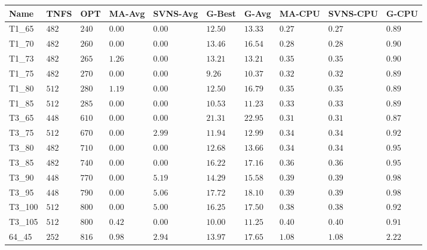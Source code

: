 \begin{center}
    \begin{table}[]
    \centering
    \begin{adjustwidth}{-0.4in}{-1in}
    \begin{tabular}{|lll|l|l|ll|lll|}
\hline
Name    & TNFS    & OPT    & MA-Avg & SVNS-Avg & G-Best   & G-Avg   & MA-CPU & SVNS-CPU & G-CPU \\
\hline
T1\_65  & $482   $& $240 $ & $\bm{0.00}$ & $\bm{0.00}$   & $12.50$  & $13.33$ & $0.27$ & $0.27$ & $0.89$ \\
T1\_70  & $482   $& $260 $ & $\bm{0.00}$ & $\bm{0.00}$   & $13.46$  & $16.54$ & $0.28$ & $0.28$ & $0.90$ \\
T1\_73  & $482   $& $265 $ & $1.26$ & $\bm{0.00}$   & $13.21$  & $13.21$ & $0.35$ & $0.35$ & $0.90$ \\
T1\_75  & $482   $& $270 $ & $\bm{0.00}$ & $\bm{0.00}$   & $9.26 $  & $10.37$ & $0.32$ & $0.32$ & $0.89$ \\
T1\_80  & $512   $& $280 $ & $1.19$ & $\bm{0.00}$   & $12.50$  & $16.79$ & $0.35$ & $0.35$ & $0.89$ \\
T1\_85  & $512   $& $285 $ & $\bm{0.00}$ & $\bm{0.00}$   & $10.53$  & $11.23$ & $0.33$ & $0.33$ & $0.89$ \\
\hline
T3\_65  & $448   $& $610 $ & $\bm{0.00}$ & $\bm{0.00}$   & $21.31$  & $22.95$ & $0.31$ & $0.31$ & $0.87$ \\
T3\_75  & $512   $& $670 $ & $\bm{0.00}$ & $2.99$   & $11.94$  & $12.99$ & $0.34$ & $0.34$ & $0.92$ \\
T3\_80  & $482   $& $710 $ & $\bm{0.00}$ & $\bm{0.00}$   & $12.68$  & $13.66$ & $0.34$ & $0.34$ & $0.95$ \\
T3\_85  & $482   $& $740 $ & $\bm{0.00}$ & $\bm{0.00}$   & $16.22$  & $17.16$ & $0.36$ & $0.36$ & $0.95$ \\
T3\_90  & $448   $& $770 $ & $\bm{0.00}$ & $5.19$   & $14.29$  & $15.58$ & $0.39$ & $0.39$ & $0.98$ \\
T3\_95  & $448   $& $790 $ & $\bm{0.00}$ & $5.06$   & $17.72$  & $18.10$ & $0.39$ & $0.39$ & $0.98$ \\
T3\_100 & $512   $& $800 $ & $\bm{0.00}$ & $5.00$   & $16.25$  & $17.50$ & $0.38$ & $0.38$ & $0.92$ \\
T3\_105 & $512   $& $800 $ & $0.42$ & $\bm{0.00}$   & $10.00$  & $11.25$ & $0.40$ & $0.40$ & $0.91$ \\
\hline
64\_45  & $252   $& $816 $ & $0.98$ & $2.94$   & $13.97$  & $17.65$ & $1.08$ & $1.08$ & $2.22$ \\

\end{tabular}
\end{adjustwidth}
\end{table}
\end{center}
